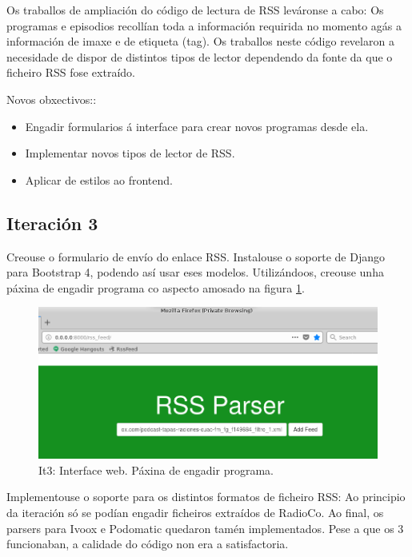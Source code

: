 Os traballos de ampliación do código de lectura de RSS leváronse a cabo: Os programas e episodios recollían toda a información requirida no momento agás a información de imaxe e de etiqueta (tag). Os traballos neste código revelaron a necesidade de dispor de distintos tipos de lector dependendo da fonte da que o ficheiro RSS fose extraído. 

Novos obxectivos:: 

\begin{itemize}
	\item Engadir formularios á interface para crear novos programas desde ela.
	\item Implementar novos tipos de lector de RSS.
	\item Aplicar  de estilos ao frontend. 
\end{itemize}

\subsection{Iteración 3}

Creouse o formulario de envío do enlace RSS. Instalouse o soporte de Django para Bootstrap 4, podendo así usar eses modelos. Utilizándoos, creouse unha páxina de engadir programa co aspecto amosado na figura \ref{fig:it3_add_program}.

\begin{figure}[h]
	\centering
	\includegraphics[scale=0.5,keepaspectratio=true]{./images/it3_add_program.png}
	\caption{It3: Interface web. Páxina de engadir programa.}
	\label{fig:it3_add_program}
\end{figure}

Implementouse o soporte para os distintos formatos de ficheiro RSS: Ao principio da iteración só se podían engadir ficheiros extraídos de RadioCo. Ao final, os parsers para Ivoox e Podomatic quedaron tamén implementados. Pese a que os 3 funcionaban, a calidade do código non era a satisfactoria.

